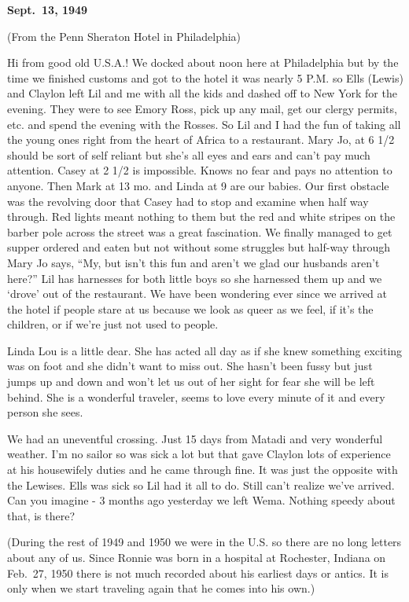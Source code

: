 \documentclass[]{book}
\begin{document}
\textbf{Sept.~13, 1949}

(From the Penn Sheraton Hotel in Philadelphia)

Hi from good old U.S.A.! We docked about noon here at Philadelphia but by the time we finished customs and got to the hotel it was nearly 5 P.M. so Ells (Lewis) and Claylon left Lil and me with all the kids and dashed off to New York for the evening. They were to see Emory Ross, pick up any mail, get our clergy permits, etc. and spend the evening with the Rosses. So Lil and I had the fun of taking all the young ones right from the heart of Africa to a restaurant. Mary Jo, at 6 1/2 should be sort of self reliant but she's all eyes and ears and can't pay much attention. Casey at 2 1/2 is impossible. Knows no fear and pays no attention to anyone. Then Mark at 13 mo. and Linda at 9 are our babies. Our first obstacle was the revolving door that Casey had to stop and examine when half way through. Red lights meant nothing to them but the red and white stripes on the barber pole across the street was a great fascination. We finally managed to get supper ordered and eaten but not without some struggles but half-way through Mary Jo says, ``My, but isn't this fun and aren't we glad our husbands aren't here?'' Lil has harnesses for both little boys so she harnessed them up and we `drove' out of the restaurant. We have been wondering ever since we arrived at the hotel if people stare at us because we look as queer as we feel, if it's the children, or if we're just not used to people.

Linda Lou is a little dear. She has acted all day as if she knew something exciting was on foot and she didn't want to miss out. She hasn't been fussy but just jumps up and down and won't let us out of her sight for fear she will be left behind. She is a wonderful traveler, seems to love every minute of it and every person she sees.

We had an uneventful crossing. Just 15 days from Matadi and very wonderful weather. I'm no sailor so was sick a lot but that gave Claylon lots of experience at his housewifely duties and he came through fine. It was just the opposite with the Lewises. Ells was sick so Lil had it all to do. Still can't realize we've arrived. Can you imagine - 3 months ago yesterday we left Wema. Nothing speedy about that, is there?

(During the rest of 1949 and 1950 we were in the U.S. so there are no long letters about any of us. Since Ronnie was born in a hospital at Rochester, Indiana on Feb.~27, 1950 there is not much recorded about his earliest days or antics. It is only when we start traveling again that he comes into his own.)
\end{document}

